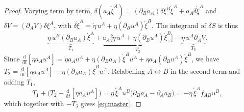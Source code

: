 \documentclass[10pt,a4paper]{amsart}
\newcommand{\dd}{\mathrm{d}}
\newcommand{\pd}[1]{\partial_{#1}}
\theoremstyle{plain}
\theoremstyle{definition}
\theoremstyle{remark}
\begin{document}
	\begin{proof}
		Varying term by term,
		$\delta(a_{A}\dot\xi^{A})=(\pd{B}a_{A})\delta\xi^{B}\dot\xi^{A}
		+a_{A}\delta\dot\xi^{A}$ and $\delta V=(\pd{A}V)\delta\xi^{A}$, with
		$\delta\dot\xi^{A}=\dot\eta\,u^{A}+\eta(\pd{B}u^{A})\dot\xi^{B}$. The integrand
		of $\delta S$ is thus
		\[
		\underbrace{\eta\,u^{B}(\pd{B}a_{A})\dot\xi^{A}}_{T_{1}}
		+\underbrace{a_{A}\bigl[\dot\eta\,u^{A}
			+\eta(\pd{B}u^{A})\dot\xi^{B}\bigr]}_{T_{2}}
		-\underbrace{\eta\,u^{A}\pd{A}V}_{T_{3}} .
		\]
		Since
		$\tfrac{\dd}{\dd t}[\eta a_{A}u^{A}]
		=\dot\eta a_{A}u^{A}+\eta(\pd{B}a_{A})\dot\xi^{B}u^{A}
		+\eta a_{A}(\pd{B}u^{A})\dot\xi^{B}$, we have
		$T_{2}=\tfrac{\dd}{\dd t}[\eta a_{A}u^{A}]-\eta(\pd{B}a_{A})\dot\xi^{B}u^{A}$.
		Relabelling $A\leftrightarrow B$ in the second term and adding $T_{1}$,
		\[
		T_{1}+\bigl(T_{2}-\tfrac{\dd}{\dd t}[\eta a_{A}u^{A}]\bigr)
		=\eta\,\dot\xi^{A}u^{B}\bigl(\pd{B}a_{A}-\pd{A}a_{B}\bigr)
		=-\eta\,\dot\xi^{A}f_{AB}u^{B},
		\]
		which together with $-T_{3}$ gives \eqref{eq:master}.
	\end{proof}
\end{document}
